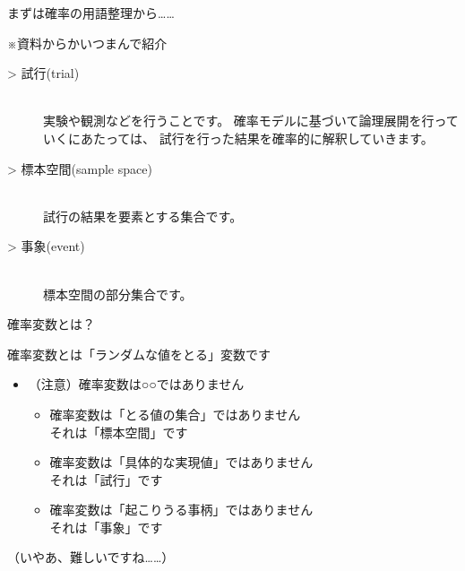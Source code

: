 \documentclass[dvipdfmx,cjk]{beamer}
\begin{document}
\begin{frame}{まずは確率の用語整理から……}

※資料からかいつまんで紹介

\vskip 1cm

\begin{description}

    \item[> 試行(trial)]\mbox{}\\
            実験や観測などを行うことです。
            確率モデルに基づいて論理展開を行っていくにあたっては、
            試行を行った結果を確率的に解釈していきます。

    \item[> 標本空間(sample space)]\mbox{}\\
            試行の結果を要素とする集合です。

    \item[> 事象(event)]\mbox{}\\
            標本空間の部分集合です。

\end{description}

\end{frame}


\begin{frame}{確率変数とは？}

確率変数とは「ランダムな値をとる」変数です

\vskip 1cm

\begin{itemize}

    \item （注意）確率変数は○○ではありません
        \begin{itemize}
        \item 確率変数は「とる値の集合」ではありません\\
                それは「標本空間」です
        \item 確率変数は「具体的な実現値」ではありません\\
                それは「試行」です
        \item 確率変数は「起こりうる事柄」ではありません\\
                それは「事象」です
        \end{itemize}

\end{itemize}

\vskip 1cm

（いやあ、難しいですね……）

\end{frame}
\end{document}
